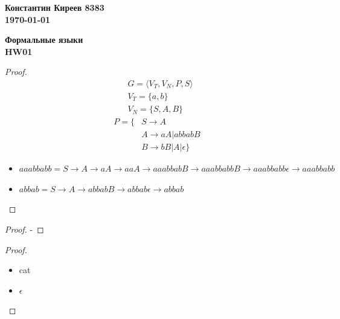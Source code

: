 \documentclass[12pt,a4paper]{article}%
\begin{document}
\begin{flushright}
    \textbf{Константин Киреев 8383\\
    \today}
    \end{flushright}
    
    \begin{center}
    \textbf{Формальные языки\\
    HW01} \\
    \end{center}
    \begin{proof}
        \begin{align*}            
            &G = \langle V_T, V_N, P, S \rangle \\
            &V_T = \{a, b\} \\
            &V_N = \{S, A, B\}
        \end{align*}
        \begin{align*}  
            P = \{&S\rightarrow A \\ 
            &A \rightarrow aA | abbabB \\
            &B \rightarrow bB | A | \epsilon \} 
        \end{align*}
        
        \begin{itemize}
            \item $aaabbabb = S\rightarrow A \rightarrow aA\rightarrow aaA\rightarrow aaabbabB\rightarrow aaabbabbB\rightarrow aaabbabb\epsilon\rightarrow aaabbabb$
            \item $abbab = S\rightarrow A\rightarrow abbabB \rightarrow abbab\epsilon\rightarrow abbab$
        \end{itemize}
        \begin{figure}[h!]
        \end{figure}
    \end{proof}   
    \begin{proof}
        -
    \end{proof}

    \begin{proof}
        $ $
        \begin{itemize}
            \item cat
            \item $\epsilon$
        \end{itemize}
    \end{proof}
\end{document}
